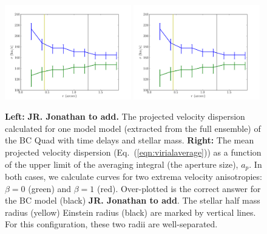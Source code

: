 \documentclass[galley,usenatbib]{mn2e}
\newcommand{\eqnref}[1] {Eq.~(\ref{#1})}
\begin{document}
\begin{figure}
\includegraphics[width=0.49\textwidth]{BCQuadR1a_TmS-sb.pdf}
\includegraphics[width=0.49\textwidth]{BCQuadR1a_TmS-sb.pdf}
\caption{{\bf Left:} {\bf JR. Jonathan to add.} The projected velocity dispersion calculated for one model model (extracted from the full ensemble) of the BC Quad with time delays and stellar mass. {\bf Right:} The mean projected velocity dispersion (\eqnref{eqn:virialaverage}) as a function of the upper limit of the averaging integral (the aperture size), $a_p$. In both cases, we calculate curves for two extrema velocity anisotropies: $\beta=0$ (green) and $\beta=1$ (red). Over-plotted is the correct answer for the BC model (black) {\bf JR. Jonathan to add}. The stellar half mass radius (yellow) Einstein radius (black) are marked by vertical lines. For this configuration, these two radii are well-separated.}
\label{sigma-beta}
\end{figure}

%
\end{document}
